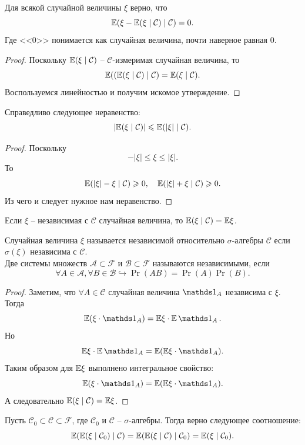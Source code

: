 \begin{property}
    Для всякой случайной величины $\xi$ верно, что
    \[
        \mathbb{E}(\xi - \mathbb{E}(\xi \mid \mathcal{C}) \mid \mathcal{C}) = 0.
    \]
    Где <<0>> понимается как случайная величина, почти наверное равная 0.
\end{property}
\begin{proof}
    Поскольку $\mathbb{E}(\xi \mid \mathcal{C})$ -- $\mathcal{C}$-измеримая случайная величина, то \[\mathbb{E}((\mathbb{E}(\xi \mid \mathcal{C}) \mid \mathcal{C}) = \mathbb{E}(\xi \mid \mathcal{C}).\]
    Воспользуемся линейностью и получим искомое утверждение.
\end{proof}
\begin{property}
    Справедливо следующее неравенство:
    \[
        |\mathbb{E}(\xi \mid \mathcal{C})| \leqslant \mathbb{E}(|\xi| \mid \mathcal{C}).
    \]  
\end{property}
\begin{proof}
    Поскольку 
    \[
        -|\xi| \leq \xi \leq |\xi|.
    \]
    То 
    \[
        \mathbb{E}(|\xi| - \xi \mid \mathcal{C}) \geqslant 0, \quad \mathbb{E}(|\xi| + \xi \mid \mathcal{C} ) \geqslant 0.
    \]
    Из чего и следует нужное нам неравенство.
\end{proof}
\begin{property}
    Если $\xi$ -- независимая с $\mathcal{C}$ случайная величина, то $\mathbb{E}(\xi \mid \mathcal{C}) = \mathbb{E} \xi$.
\end{property}
\begin{reminder}
    Случайная величина $\xi$ называется независимой относительно $\sigma$-алгебры $\mathcal{C}$ если $\sigma(\xi)$ независима с $\mathcal{C}$. \\
    Две системы множеств $\mathcal{A} \subset \mathcal{F}$ и $\mathcal{B} \subset \mathcal{F}$ называются независимыми, если 
    \[
        \forall A \in \mathcal{A}, \forall B \in \mathcal{B} \hookrightarrow \Pr(AB) = \Pr(A)\Pr(B).
    \]
\end{reminder}
\begin{proof}
    Заметим, что $\forall A \in \mathcal{C}$ случайная величина $\Ind_{A}$ независима с $\xi$. Тогда 
    \[
        \Ex(\xi \cdot \Ind_{A}) = \Ex \xi \cdot \Ex \Ind_{A}.
    \]
    Но 
    \[
        \Ex \xi \cdot \Ex \Ind_{A} = \Ex (\Ex \xi \cdot \Ind_{A}).
    \]
    Таким образом для $\mathbb{E} \xi$ выполнено интегральное свойство:
    \[
        \Ex(\xi \cdot \Ind_{A}) = \Ex (\Ex \xi \cdot \Ind_{A}).
    \]
    А следовательно $\mathbb{E}(\xi \mid \mathcal{C}) = \mathbb{E} \xi$.
\end{proof}
\begin{property}
    Пусть $\mathcal{C}_0 \subset \mathcal{C} \subset \mathcal{F}$, где $\mathcal{C}_0$ и $\mathcal{C}$ -- $\sigma$-алгебры. Тогда верно следующее соотношение:
    \[
        \mathbb{E}(\mathbb{E}(\xi \mid \mathcal{C}_0)\mid \mathcal{C}) = \mathbb{E}(\mathbb{E}(\xi \mid \mathcal{C}) \mid \mathcal{C}_0) = \mathbb{E}(\xi \mid \mathcal{C}_0).
    \]
\end{property}
